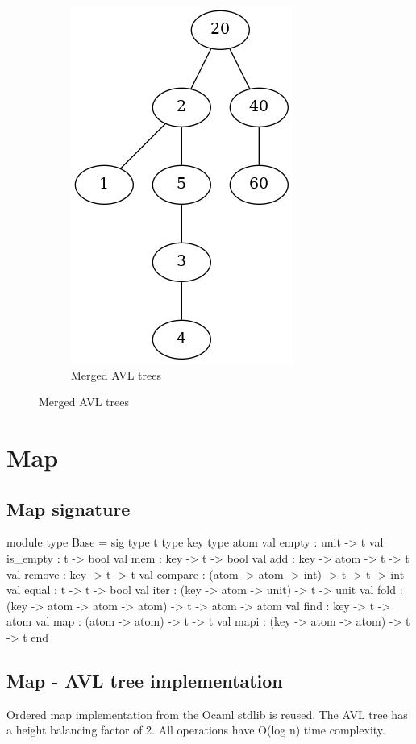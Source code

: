 \documentclass{article}
\begin{document}
\begin{figure}[H]
\begin{subfigure}{\linewidth}
\begin{center}
  \includegraphics[height=.3\textheight,keepaspectratio]{set-avl-merged.png}
  \end{center}
  \caption{Merged AVL trees}
  \end{subfigure}
\end{figure}

\newpage
\section{Map}
\subsection{Map signature}
\begin{longlisting}
module type Base = sig
  type t
  type key
  type atom
  val empty : unit -> t
  val is_empty : t -> bool
  val mem : key -> t -> bool
  val add : key -> atom -> t -> t
  val remove : key -> t -> t
  val compare : (atom -> atom -> int) -> t -> t -> int
  val equal : t -> t -> bool
  val iter : (key -> atom -> unit) -> t -> unit
  val fold : (key -> atom -> atom -> atom) -> t -> atom -> atom
  val find : key -> t -> atom
  val map : (atom -> atom) -> t -> t
  val mapi : (key -> atom -> atom) -> t -> t
end
\end{longlisting}

\subsection{Map - AVL tree implementation}
Ordered map implementation from the Ocaml stdlib is reused. The AVL tree has a height balancing factor of 2. 
All operations have O(log n) time complexity.
\end{document}
